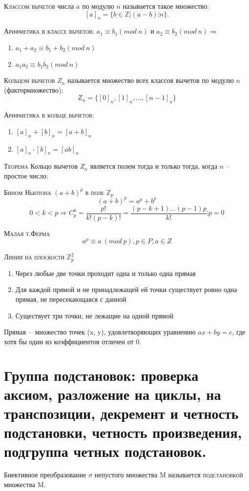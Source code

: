 \documentclass{article}
\begin{document}
\textsc{Классом вычетов} числа $a$ по модулю $n$ называется такое множество:
$$[a]_n=\{b\in \mathbb{Z}|(a-b)\vdots n\}.$$

\textsc{Арифметика в классе вычетов:}
$a_1\equiv b_1 (mod\ n)$ и $a_2\equiv b_2 (mod\ n)\Rightarrow$
\begin{enumerate}
    \item $a_1+a_2\equiv b_1+b_2 (mod\ n)$
    \item $a_1a_2\equiv b_1b_2 (mod\ n)$
\end{enumerate}

\textsc{Кольцом вычетов} $Z_n$ называется множество всех классов вычетов по модулю $n$ (фактормножество):
$$Z_n=\{[0]_n, [1]_n,\dots , [n-1]_n\}$$

\textsc{Арифметика в кольце вычетов:}
\begin{enumerate}
    \item $[a]_n+[b]_n=[a+b]_n$
    \item $[a]_n\cdot [b]_n=[ab]_n$
\end{enumerate}

\textsc{Теорема} Кольцо вычетов $Z_n$ является полем тогда и только тогда, когда $n$ – простое число:

\textsc{Бином Ньютона $(a+b)^p$ в поле $\mathbb{Z}_p$}
$$(a+b)^p=a^p+b^p$$
$$0<k<p\Rightarrow C^k_p=\frac{p!}{k!(p-k)!}=\frac{(p-k+1)\dots(p-1)p}{k!}\vdots p=0$$

\textsc{Малая т.Ферма}
$$a^p\equiv a\ (mod\ p), p\in P, a\in Z$$

\textsc{Линии на плоскости $\mathbb{Z}^2_p$}
\begin{enumerate}
    \item Через любые две точки проходит одна и только одна прямая
    \item Для каждой прямой и не принадлежащей ей точки существует ровно одна прямая, не пересекающаяся с данной
    \item Существует три точки, не лежащие на одной прямой
\end{enumerate}
Прямая – множество точек (x, y), удовлетворяющих уравнению $ax+by=c$, где хотя бы один из коэффициентов отличен от 0. 

\section{Группа подстановок: проверка аксиом, разложение на циклы, на транспозиции, декремент и четность подстановки, четность произведения, подгруппа четных подстановок.}
Биективное преобразование $\sigma$ непустого множества M называется \textsc{подстановкой} множества M.
\end{document}
